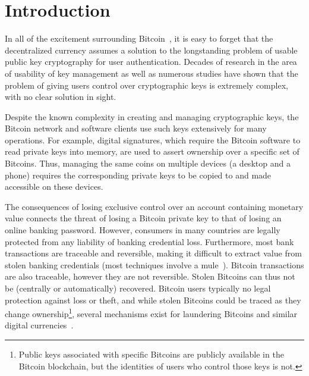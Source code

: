

\section{Introduction}
In all of the excitement surrounding Bitcoin~\cite{Nak08}, it is easy to forget that the decentralized currency assumes a solution to the longstanding problem of usable public key cryptography for user authentication. Decades of research in the area of usability of key management as well as numerous studies have shown that the problem of giving users control over cryptographic keys is extremely complex, with no clear solution in sight. 

Despite the known complexity in creating and managing cryptographic keys, the Bitcoin network and software clients use such keys extensively for many operations. For example, digital signatures, which require the Bitcoin software to read private keys into memory, are used to assert ownership over a specific set of Bitcoins. Thus, managing the same coins on multiple devices (\eg a desktop and a phone) requires the corresponding private keys to be copied to and made accessible on these devices. 


The consequences of losing exclusive control over an account containing monetary value connects the threat of losing a Bitcoin private key to that of losing an online banking password. However, consumers in many countries are legally protected from any liability of banking credential loss. Furthermore, most bank transactions are traceable and reversible, making it difficult to extract value from stolen banking credentials (most techniques involve a mule~\cite{FH12}). Bitcoin transactions are also traceable, however they are not reversible. Stolen Bitcoins can thus not be (centrally or automatically) recovered. Bitcoin users typically no legal protection against loss or theft, and while stolen Bitcoins could be traced as they change ownership\footnote{Public keys associated with specific Bitcoins are publicly available in the Bitcoin blockchain, but the identities of users who control those keys is not.}, several mechanisms exist for laundering Bitcoins and similar digital currencies~\cite{MGGR13,BNMC+14}.

